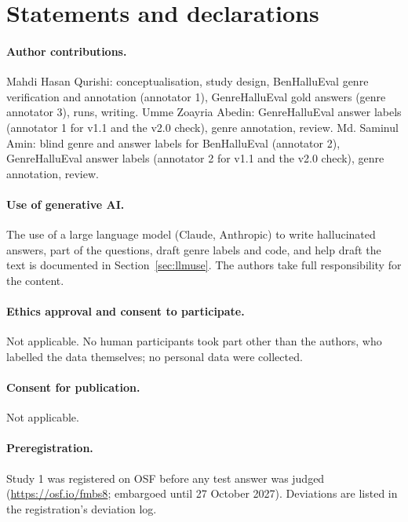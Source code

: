 \documentclass[11pt]{article}
\begin{document}
\section*{Statements and declarations}

\paragraph{Author contributions.} Mahdi Hasan Qurishi: conceptualisation, study
design, BenHalluEval genre verification and annotation (annotator 1), GenreHalluEval gold answers (genre annotator 3),
runs, writing. Umme Zoayria Abedin: GenreHalluEval answer labels (annotator 1 for v1.1 and the v2.0 check),
genre annotation, review. Md. Saminul Amin: blind genre and answer labels for BenHalluEval (annotator 2), GenreHalluEval
answer labels (annotator 2 for v1.1 and the v2.0 check), genre annotation, review.

\paragraph{Use of generative AI.} The use of a large language model (Claude, Anthropic) to write hallucinated
answers, part of the questions, draft genre labels and code, and help draft the text is documented in
Section~\ref{sec:llmuse}. The authors take full responsibility for the content.

\paragraph{Ethics approval and consent to participate.} Not applicable. No human participants took part other than
the authors, who labelled the data themselves; no personal data were collected.

\paragraph{Consent for publication.} Not applicable.

\paragraph{Preregistration.} Study 1 was registered on OSF before any test answer was judged
(\url{https://osf.io/fmbs8}; embargoed until 27 October 2027). Deviations are listed in the
registration's deviation log.
\end{document}
